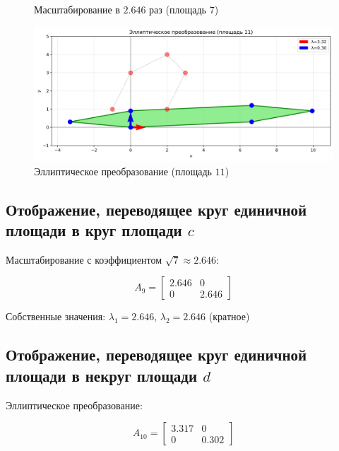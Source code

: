 \begin{figure}[h]
\begin{minipage}{0.31\textwidth}
\caption{Масштабирование в $2.646$ раз (площадь $7$)}
\label{fig:scaling_c}
\end{minipage}
\hfill
\begin{minipage}{0.31\textwidth}
\centering
\includegraphics[width=\textwidth]{images/task1/elliptic_d.png}
\caption{Эллиптическое преобразование (площадь $11$)}
\label{fig:elliptic_d}
\end{minipage}
\end{figure}

\subsection*{Отображение, переводящее круг единичной площади в круг площади $c$}

Масштабирование с коэффициентом $\sqrt{7} \approx 2.646$:

\begin{equation}
A_9 = \begin{bmatrix} 2.646 & 0 \\ 0 & 2.646 \end{bmatrix}
\end{equation}

Собственные значения: $\lambda_1 = 2.646$, $\lambda_2 = 2.646$ (кратное)

\subsection*{Отображение, переводящее круг единичной площади в некруг площади $d$}

Эллиптическое преобразование:

\begin{equation}
A_{10} = \begin{bmatrix} 3.317 & 0 \\ 0 & 0.302 \end{bmatrix}
\end{equation}

